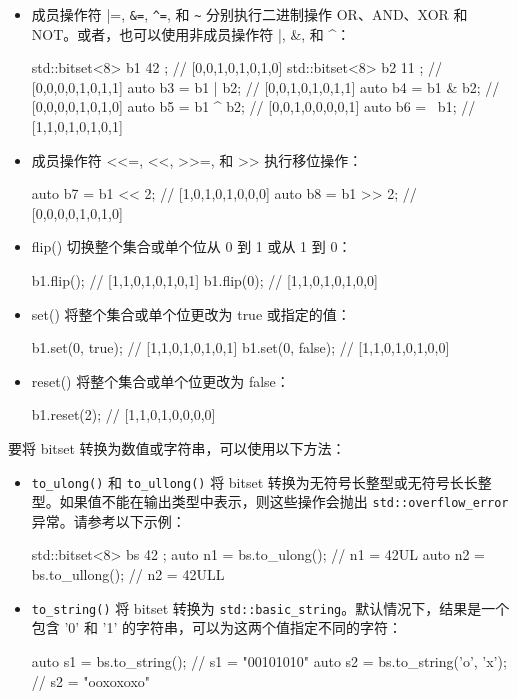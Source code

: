 \begin{itemize}
\item
成员操作符 |=, \verb|&=|, \verb|^=|, 和 \verb|~| 分别执行二进制操作 OR、AND、XOR 和 NOT。或者，也可以使用非成员操作符 |, \&, 和 \^{}：

\begin{cpp}
std::bitset<8> b1{ 42 }; // [0,0,1,0,1,0,1,0]
std::bitset<8> b2{ 11 }; // [0,0,0,0,1,0,1,1]
auto b3 = b1 | b2;       // [0,0,1,0,1,0,1,1]
auto b4 = b1 & b2;       // [0,0,0,0,1,0,1,0]
auto b5 = b1 ^ b2;       // [0,0,1,0,0,0,0,1]
auto b6 = ~b1;           // [1,1,0,1,0,1,0,1]
\end{cpp}

\item
成员操作符 <{}<=, <{}<, >{}>=, 和 >{}> 执行移位操作：

\begin{cpp}
auto b7 = b1 << 2;       // [1,0,1,0,1,0,0,0]
auto b8 = b1 >> 2;       // [0,0,0,0,1,0,1,0]
\end{cpp}

\item
flip() 切换整个集合或单个位从 0 到 1 或从 1 到 0：

\begin{cpp}
b1.flip();               // [1,1,0,1,0,1,0,1]
b1.flip(0);              // [1,1,0,1,0,1,0,0]
\end{cpp}

\item
set() 将整个集合或单个位更改为 true 或指定的值：

\begin{cpp}
b1.set(0, true);         // [1,1,0,1,0,1,0,1]
b1.set(0, false);        // [1,1,0,1,0,1,0,0]
\end{cpp}

\item
reset() 将整个集合或单个位更改为 false：

\begin{cpp}
b1.reset(2);             // [1,1,0,1,0,0,0,0]
\end{cpp}
\end{itemize}

要将 bitset 转换为数值或字符串，可以使用以下方法：

\begin{itemize}
\item
\verb|to_ulong()| 和 \verb|to_ullong()| 将 bitset 转换为无符号长整型或无符号长长整型。如果值不能在输出类型中表示，则这些操作会抛出 \verb|std::overflow_error| 异常。请参考以下示例：

\begin{cpp}
std::bitset<8> bs{ 42 };
auto n1 = bs.to_ulong();  // n1 = 42UL
auto n2 = bs.to_ullong(); // n2 = 42ULL
\end{cpp}

\item
\verb|to_string()| 将 bitset 转换为 \verb|std::basic_string|。默认情况下，结果是一个包含 '0' 和 '1' 的字符串，可以为这两个值指定不同的字符：

\begin{cpp}
auto s1 = bs.to_string();         // s1 = "00101010"
auto s2 = bs.to_string('o', 'x'); // s2 = "ooxoxoxo"
\end{cpp}
\end{itemize}

